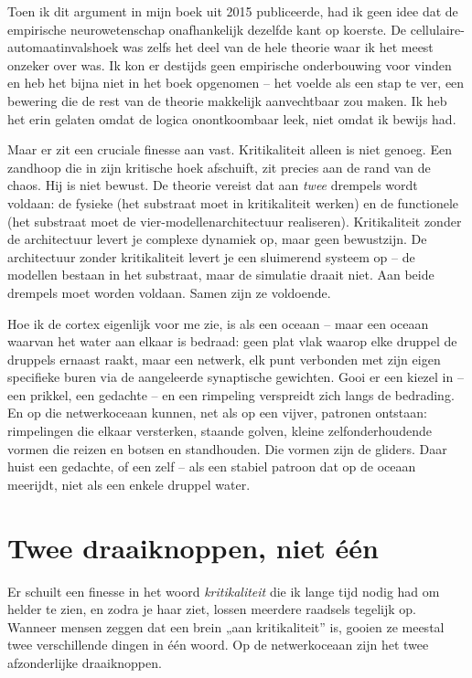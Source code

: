 \documentclass[11pt, twoside, openright]{book}
\begin{document}
Toen ik dit argument in mijn boek uit 2015 publiceerde, had ik geen idee dat de empirische neurowetenschap onafhankelijk dezelfde kant op koerste. De cellulaire-automaatinvalshoek was zelfs het deel van de hele theorie waar ik het meest onzeker over was. Ik kon er destijds geen empirische onderbouwing voor vinden en heb het bijna niet in het boek opgenomen -- het voelde als een stap te ver, een bewering die de rest van de theorie makkelijk aanvechtbaar zou maken. Ik heb het erin gelaten omdat de logica onontkoombaar leek, niet omdat ik bewijs had.

Maar er zit een cruciale finesse aan vast. Kritikaliteit alleen is niet genoeg. Een zandhoop die in zijn kritische hoek afschuift, zit precies aan de rand van de chaos. Hij is niet bewust. De theorie vereist dat aan \textit{twee} drempels wordt voldaan: de fysieke (het substraat moet in kritikaliteit werken) en de functionele (het substraat moet de vier-modellenarchitectuur realiseren). Kritikaliteit zonder de architectuur levert je complexe dynamiek op, maar geen bewustzijn. De architectuur zonder kritikaliteit levert je een sluimerend systeem op -- de modellen bestaan in het substraat, maar de simulatie draait niet. Aan beide drempels moet worden voldaan. Samen zijn ze voldoende.

Hoe ik de cortex eigenlijk voor me zie, is als een oceaan -- maar een oceaan waarvan het water aan elkaar is bedraad: geen plat vlak waarop elke druppel de druppels ernaast raakt, maar een netwerk, elk punt verbonden met zijn eigen specifieke buren via de aangeleerde synaptische gewichten. Gooi er een kiezel in -- een prikkel, een gedachte -- en een rimpeling verspreidt zich langs de bedrading. En op die netwerkoceaan kunnen, net als op een vijver, patronen ontstaan: rimpelingen die elkaar versterken, staande golven, kleine zelfonderhoudende vormen die reizen en botsen en standhouden. Die vormen zijn de gliders. Daar huist een gedachte, of een zelf -- als een stabiel patroon dat op de oceaan meerijdt, niet als een enkele druppel water.

\section*{Twee draaiknoppen, niet één}

Er schuilt een finesse in het woord \textit{kritikaliteit} die ik lange tijd nodig had om helder te zien, en zodra je haar ziet, lossen meerdere raadsels tegelijk op. Wanneer mensen zeggen dat een brein „aan kritikaliteit” is, gooien ze meestal twee verschillende dingen in één woord. Op de netwerkoceaan zijn het twee afzonderlijke draaiknoppen.
\end{document}
